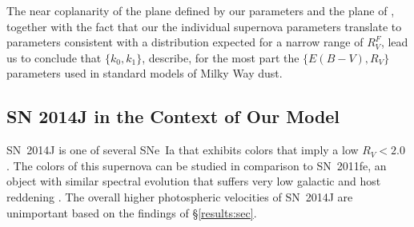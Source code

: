 \documentclass{aastex61}   	%
\begin{document}
%
%
%

The near coplanarity of the plane defined by our parameters and the plane of  , together with the fact that our the individual supernova
parameters translate to   parameters consistent with a distribution expected for a narrow range of $R^F_V$, lead us to conclude that 
$\{k_0, k_1\}$, describe, for the most part the $\{ E(B-V), R_V\}$ parameters used
in standard models of Milky Way dust.

\subsection{SN 2014J in the Context of Our Model}
\label{sn2014j:sec}

SN~2014J   is one of several SNe~Ia that exhibits colors that imply a low $R_V<2.0$ \citep{2014ApJ...788L..21A, 2014MNRAS.443.2887F, 
2014arXiv1411.3332J,
2014ApJ...795L...4K, 2015ApJ...805...74B}.
The colors of this supernova can be studied in comparison to SN~2011fe, an object with similar
spectral evolution that 
suffers very low galactic and host reddening
\citep[this technique has been used in][]{2006MNRAS.369.1880E,2007AJ....133...58K,2008MNRAS.384..107E,2010AJ....139..120F, 2014ApJ...788L..21A}.
The overall higher photospheric velocities of
SN~2014J are unimportant  based on the findings of  \S\ref{results:sec}.
\end{document}
